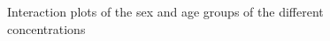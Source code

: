 \documentclass{article}
\begin{document}
\begin{figure}[H]
          \caption{Interaction plots of the sex and age groups of the different concentrations}
          \label{fig:IntAgeSex}
      \end{figure}
\end{document}
